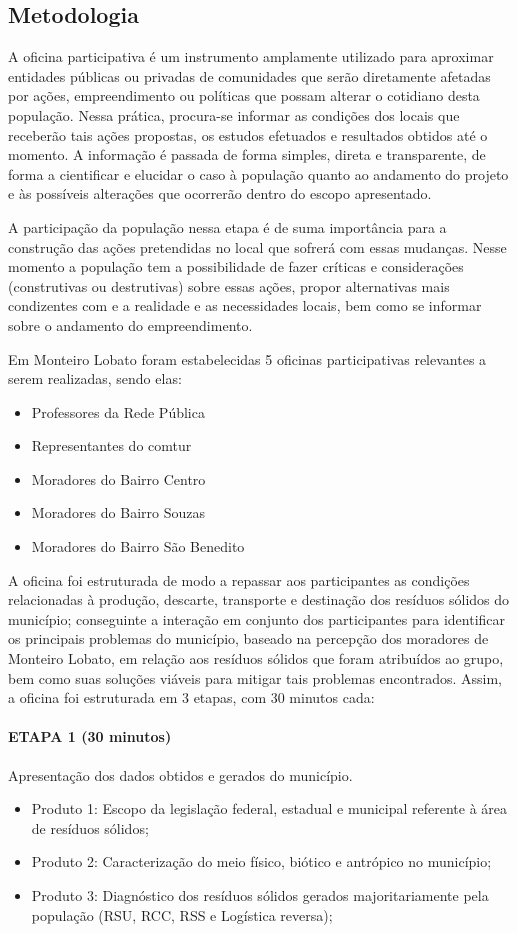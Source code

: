 \subsection{Metodologia}
A oficina participativa é um instrumento amplamente utilizado para aproximar entidades públicas ou privadas de comunidades que serão diretamente afetadas por ações, empreendimento ou políticas que possam alterar o cotidiano desta população. Nessa prática, procura-se informar as condições dos locais que receberão tais ações propostas, os estudos efetuados e resultados obtidos até o momento. A informação é passada de forma simples, direta e transparente, de forma a cientificar e elucidar o caso à população quanto ao andamento do projeto e às possíveis alterações que ocorrerão dentro do escopo apresentado. 

A participação da população nessa etapa é de suma importância para a construção das ações pretendidas no local que sofrerá com essas mudanças. Nesse momento a população tem a possibilidade de fazer críticas e considerações (construtivas ou destrutivas) sobre essas ações, propor alternativas mais condizentes com e a realidade e as necessidades locais, bem como se informar sobre o andamento do empreendimento.

Em Monteiro Lobato foram estabelecidas 5 oficinas participativas relevantes a serem realizadas, sendo elas:

\begin{itemize}
	\item Professores da Rede Pública
	\item Representantes do \gls{comtur}
	\item Moradores do Bairro Centro
	\item Moradores do Bairro Souzas
	\item Moradores do Bairro São Benedito
\end{itemize}

A oficina foi estruturada de modo a repassar aos participantes as condições relacionadas à produção, descarte, transporte e destinação dos resíduos sólidos do município; conseguinte a interação em conjunto dos participantes para identificar os principais problemas do município, baseado na percepção dos moradores de Monteiro Lobato, em relação aos resíduos sólidos que foram atribuídos ao grupo, bem como suas soluções viáveis para mitigar tais problemas encontrados. Assim, a oficina foi estruturada em 3 etapas, com 30 minutos cada: 


\paragraph{ETAPA 1 (30 minutos)} Apresentação dos dados obtidos e gerados do município.
\begin{itemize}
	\item Produto 1: Escopo da legislação federal, estadual e municipal referente à área de resíduos sólidos;
	\item Produto 2: Caracterização do meio físico, biótico e antrópico no município;
	\item Produto 3: Diagnóstico dos resíduos sólidos gerados majoritariamente pela população (RSU, RCC, RSS e Logística reversa);
\end{itemize}

